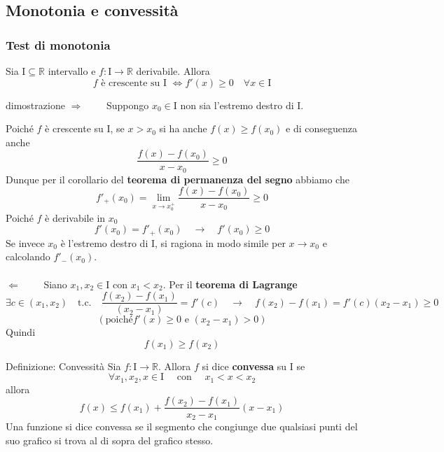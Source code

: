 \documentclass[x11names]{article}
\begin{document}
	\subsection{Monotonia e convessità}
	\begin{center}
		\colorbox{myred}{\begin{minipage}{5.75in}
				\begin{redes}{}
					\subsubsection{Test di monotonia}
					Sia $\text{I} \subseteq \mathbb{R}$ intervallo e $f: \text{I} \to \mathbb{R}$ derivabile. Allora 
					\[
					f \text{ è crescente su I } \Longleftrightarrow f'(x) \geq 0 \quad \forall x \in \text{I}
					\]
				\end{redes}
		\end{minipage}}        
	\end{center}
	\begin{es}{dimostrazione}
	$\Longrightarrow \qquad$ Suppongo $x_0 \in \text{I}$ non sia l'estremo destro di I.
	
	Poiché $f$ è crescente su I, se $x > x_0$ si ha anche $f(x) \geq f(x_0)$ e di conseguenza anche
	\[
	\frac{f(x) -f(x_0)}{x-x_0} \geq 0
	\]
	Dunque per il corollario del \textbf{teorema di permanenza del segno} abbiamo che
	\[
	f'_+(x_0) = \lim_{x \to x_0^+} \frac{f(x) -f(x_0)}{x-x_0} \geq 0
	\]
	Poiché $f$ è derivabile in $x_0$ 
	\[
	f'(x_0) = f'_+(x_0) \quad \to \quad f'(x_0) \geq 0
	\]
	Se invece $x_0$ è l'estremo destro di I, si ragiona in modo simile per $x \to x_0$ e calcolando $f'_-(x_0)$. \\ \\
	
	$\Longleftarrow \qquad$ Siano $x_1, x_2 \in \text{I}$ con $x_1 < x_2$. Per il \textbf{teorema di Lagrange}
	\[
	\exists c \in (x_1, x_2) \quad \text{t.c.} \quad  \frac{f(x_2) - f(x_1)}{(x_2-x_1)} = f'(c) \quad \to \quad f(x_2) - f(x_1) = f'(c)(x_2-x_1) \geq 0 
	\]
	\[
	(\text{poiché} f'(x) \geq 0 \text{ e } (x_2 - x_1) > 0)
	\]
	Quindi
	\[
	f(x_1) \geq f(x_2)
	\]
	\end{es}
	
		\begin{center}
		\colorbox{myblue}{\begin{minipage}{5.75in}
				\begin{blues}{Definizione: Convessità}
					Sia $f: \text{I} \to \mathbb{R}$. Allora $f$ si dice \textbf{convessa} su $\text{I}$ se 
					\[
					\forall x_1, x_2, x \in \text{I} \quad \text{ con } \quad x_1 < x < x_2
					\]
					allora
					\[
					f(x) \leq f(x_1) + \frac{f(x_2) - f(x_1)}{x_2 - x_1}(x-x_1)
					\]
					Una funzione si dice convessa se il segmento che congiunge due qualsiasi punti del suo grafico si trova al di sopra del grafico stesso.
				\end{blues}
		\end{minipage}}       
	\end{center}
	
\end{document}

